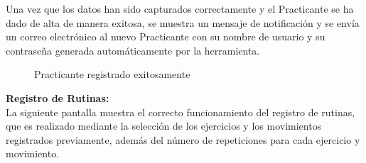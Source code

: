 Una vez que los datos han sido capturados correctamente y el Practicante se ha dado de alta de manera exitosa, se muestra un mensaje de notificación y se envía un correo electrónico al nuevo Practicante con su nombre de usuario y su contraseña generada automáticamente por la herramienta.
\begin{figure}[H]
	\centering
	\caption{Practicante registrado exitosamente}
	\label{fig:Prueba_Registro_practicante2}
\end{figure}
\textbf{Registro de Rutinas:}\\
La siguiente pantalla muestra el correcto funcionamiento del registro de rutinas, que es realizado mediante la selección de los ejercicios y los movimientos registrados previamente, además del número de repeticiones para cada ejercicio y movimiento.
